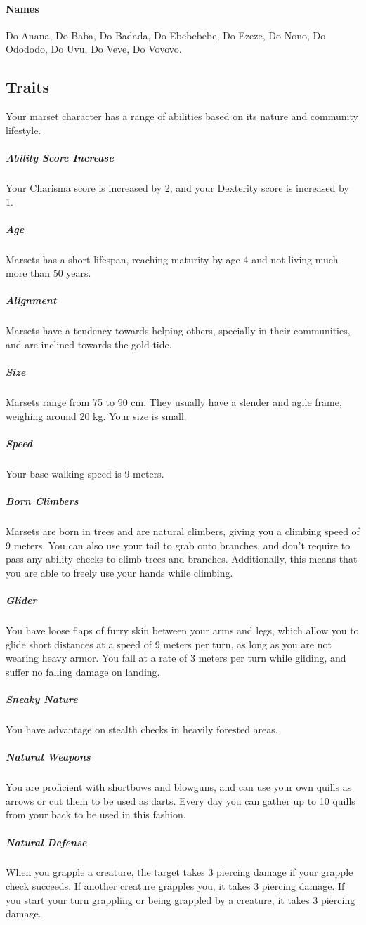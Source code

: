 \begin{linenumbers}
\paragraph{Names} Do Anana, Do Baba, Do Badada, Do Ebebebebe, Do Ezeze, Do Nono, Do Odododo, Do Uvu, Do Veve, Do Vovovo.

\subsection*{Traits}
Your marset character has a range of abilities based on its nature and community lifestyle.

\subparagraph{Ability Score Increase} Your Charisma score is increased by 2, and your Dexterity score is increased by 1.

\subparagraph{Age} Marsets has a short lifespan, reaching maturity by age 4 and not living much more than 50 years.

\subparagraph{Alignment} Marsets have a tendency towards helping others, specially in their communities, and are inclined towards the gold tide.

\subparagraph{Size} Marsets range from 75 to 90 cm.
They usually have a slender and agile frame, weighing around 20 kg.
Your size is small.

\subparagraph{Speed} Your base walking speed is 9 meters.

\subparagraph{Born Climbers} Marsets are born in trees and are natural climbers, giving you a climbing speed of 9 meters.
You can also use your tail to grab onto branches, and don't require to pass any ability checks to climb trees and branches.
Additionally, this means that you are able to freely use your hands while climbing.

\subparagraph{Glider} You have loose flaps of furry skin between your arms and legs, which allow you to glide short distances at a speed of 9 meters per turn, as long as you are not wearing heavy armor.
You fall at a rate of 3 meters per turn while gliding, and suffer no falling damage on landing.

\subparagraph{Sneaky Nature} You have advantage on stealth checks in heavily forested areas.

\subparagraph{Natural Weapons} You are proficient with shortbows and blowguns, and can use your own quills as arrows or cut them to be used as darts.
Every day you can gather up to 10 quills from your back to be used in this fashion.

\subparagraph{Natural Defense} When you grapple a creature, the target takes 3 piercing damage if your grapple check succeeds. \label{trait::naturaldefense}
If another creature grapples you, it takes 3 piercing damage.
If you start your turn grappling or being grappled by a creature, it takes 3 piercing damage.


\end{linenumbers}

